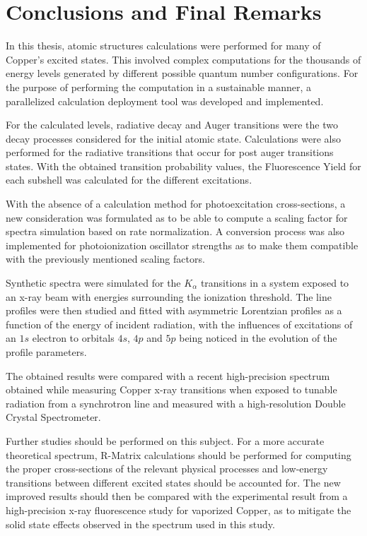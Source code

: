 %

\chapter{Conclusions and Final Remarks}

In this thesis, atomic structures calculations were performed for many of Copper's excited states. This involved complex computations for the thousands of energy levels generated by different possible quantum number configurations. For the purpose of performing the computation in a sustainable manner, a parallelized calculation deployment tool was developed and implemented.

For the calculated levels, radiative decay and Auger transitions were the two decay processes considered for the initial atomic state. Calculations were also performed for the radiative transitions that occur for post auger transitions states. With the obtained transition probability values, the Fluorescence Yield for each subshell was calculated for the different excitations.

With the absence of a calculation method for photoexcitation cross-sections, a new consideration was formulated as to be able to compute a scaling factor for spectra simulation based on rate normalization. A conversion process was also implemented for photoionization oscillator strengths as to make them compatible with the previously mentioned scaling factors.

Synthetic spectra were simulated for the $K{_\alpha}$ transitions in a system exposed to an x-ray beam with energies surrounding the ionization threshold. The line profiles were then studied and fitted with asymmetric Lorentzian profiles as a function of the energy of incident radiation, with the influences of excitations of an $1s$ electron to orbitals $4s$, $4p$ and $5p$ being noticed in the evolution of the profile parameters.

The obtained results were compared with a recent high-precision spectrum obtained while measuring Copper x-ray transitions when exposed to tunable radiation from a synchrotron line and measured with a high-resolution Double Crystal Spectrometer.

Further studies should be performed on this subject. For a more accurate theoretical spectrum, R-Matrix calculations should be performed for computing the proper cross-sections of the relevant physical processes and low-energy transitions between different excited states should be accounted for. The new improved results should then be compared with the experimental result from a high-precision x-ray fluorescence study for vaporized Copper, as to mitigate the solid state effects observed in the spectrum used in this study.

